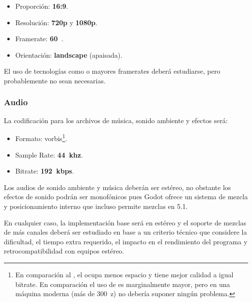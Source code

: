 \begin{itemize}
\item Proporción: \textbf{16:9}.

\item Resolución: \textbf{720p} y \textbf{1080p}.

\item Framerate: \textbf{60~}.

\item Orientación: \textbf{landscape} (apaisada).
\end{itemize}

El uso de tecnologías como  o mayores framerates deberá estudiarse, pero probablemente no sean necesarias.

\subsubsection{Audio}\label{io:output-audio}
\noindent La codificación para los archivos de música, sonido ambiente y efectos será:
\begin{itemize}
\item Formato: \textbf{} vorbis\footnote{En comparación al , el  ocupa menos espacio y tiene mejor calidad a igual bitrate. En comparación el uso de  es marginalmente mayor, pero en una máquina moderna (más de 300~z) no debería suponer ningún problema.}.

\item Sample Rate: \textbf{44~khz}.

\item Bitrate: \textbf{192~kbps}.
\end{itemize}

Los audios de sonido ambiente y música deberán ser estéreo, no obstante los efectos de sonido podrán ser monofónicos pues Godot ofrece un sistema de mezcla y posicionamiento interno que incluso permite mezclas en 5.1.

En cualquier caso, la implementación base será en estéreo y el soporte de mezclas de más canales deberá ser estudiado en base a un criterio técnico que considere la dificultad, el tiempo extra requerido, el impacto en el rendimiento del programa y retrocompatibilidad con equipos estéreo.

